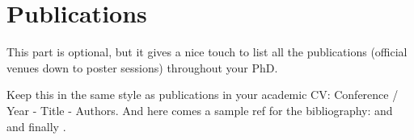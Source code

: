 \chapter*{\rm\bfseries Publications}
\label{ch:publications}

This part is optional, but it gives a nice touch to list all the publications (official venues down to poster sessions) throughout your PhD.

Keep this in the same style as publications in your academic CV: 
Conference / Year - Title - Authors. And here comes a sample ref for the bibliography: \cite{schiedermeier_fiddlr_2021} and \cite{schiedermeier_fiddlr_2021} and finally \cite{schiedermeier_fiddlr_2021}.

